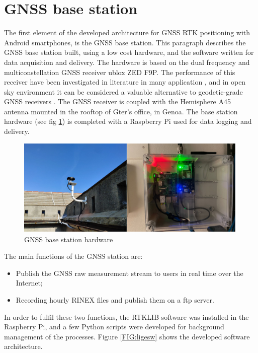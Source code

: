 \section{GNSS base station}
\label{par:lige}
The first element of the developed architecture for GNSS RTK positioning with Android smartphones, is the GNSS base station. This paragraph describes the GNSS base station built, using a low cost hardware, and the software written for data acquisition and delivery. 
The hardware  is based on the dual frequency and multiconstellation GNSS receiver ublox ZED F9P. The performance of this receiver have been investigated in literature in many application \cite{Wielgocka:2021, Nguyen:2021,Hohensinn:2021}, and in open sky environment it can be considered a valuable alternative to geodetic-grade GNSS receivers \cite{janos:2021}. The GNSS receiver is coupled with the Hemisphere A45 antenna mounted in the rooftop of Gter's office, in Genoa. The base station hardware (see fig \ref{FIG:ligehw}) is completed with a Raspberry Pi used for data logging and delivery.
%
\begin{figure}[H] 
	\centering
	\includegraphics[scale=0.40]{fig/gnss_base_lige.png} 
	\caption{GNSS base station hardware}
	\label{FIG:ligehw} 
\end{figure}
%
The main functions of the GNSS station are:
\begin{itemize}
\item Publish the GNSS raw measurement stream  to users in real time over the Internet;
\item Recording hourly RINEX files and publish them on a ftp server.
\end{itemize}
%
In order to fulfil these two functions, the RTKLIB software was installed in the Raspberry Pi, and a few Python scripts were developed for background management of the processes. Figure \ref{FIG:ligesw} shows the developed software architecture.

